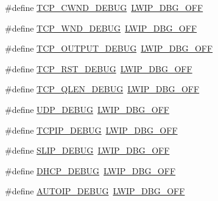 \begin{DoxyCompactItemize}
\item 
\#define \hyperlink{group__lwip__opts__debugmsg_ga66df03d8192cd978d3321a9d68bf5411}{T\+C\+P\+\_\+\+C\+W\+N\+D\+\_\+\+D\+E\+B\+UG}~\hyperlink{group__debugging__levels_gadab1cdc3f45939a3a5c9a3d7e04987e1}{L\+W\+I\+P\+\_\+\+D\+B\+G\+\_\+\+O\+FF}
\item 
\#define \hyperlink{group__lwip__opts__debugmsg_ga3704f433e947d6342da77c74e33627e1}{T\+C\+P\+\_\+\+W\+N\+D\+\_\+\+D\+E\+B\+UG}~\hyperlink{group__debugging__levels_gadab1cdc3f45939a3a5c9a3d7e04987e1}{L\+W\+I\+P\+\_\+\+D\+B\+G\+\_\+\+O\+FF}
\item 
\#define \hyperlink{group__lwip__opts__debugmsg_ga9f70601fdc1feee490772bf7fcdb74fb}{T\+C\+P\+\_\+\+O\+U\+T\+P\+U\+T\+\_\+\+D\+E\+B\+UG}~\hyperlink{group__debugging__levels_gadab1cdc3f45939a3a5c9a3d7e04987e1}{L\+W\+I\+P\+\_\+\+D\+B\+G\+\_\+\+O\+FF}
\item 
\#define \hyperlink{group__lwip__opts__debugmsg_ga37596f7bbb9b7663826244ba54486679}{T\+C\+P\+\_\+\+R\+S\+T\+\_\+\+D\+E\+B\+UG}~\hyperlink{group__debugging__levels_gadab1cdc3f45939a3a5c9a3d7e04987e1}{L\+W\+I\+P\+\_\+\+D\+B\+G\+\_\+\+O\+FF}
\item 
\#define \hyperlink{group__lwip__opts__debugmsg_gae7980c7f8eb45cd411bf410ff0a3fc55}{T\+C\+P\+\_\+\+Q\+L\+E\+N\+\_\+\+D\+E\+B\+UG}~\hyperlink{group__debugging__levels_gadab1cdc3f45939a3a5c9a3d7e04987e1}{L\+W\+I\+P\+\_\+\+D\+B\+G\+\_\+\+O\+FF}
\item 
\#define \hyperlink{group__lwip__opts__debugmsg_ga0393f312c5475a1c649b39ef9cfcaad4}{U\+D\+P\+\_\+\+D\+E\+B\+UG}~\hyperlink{group__debugging__levels_gadab1cdc3f45939a3a5c9a3d7e04987e1}{L\+W\+I\+P\+\_\+\+D\+B\+G\+\_\+\+O\+FF}
\item 
\#define \hyperlink{group__lwip__opts__debugmsg_ga52d6c83451936c3de3b0338d4a3f921f}{T\+C\+P\+I\+P\+\_\+\+D\+E\+B\+UG}~\hyperlink{group__debugging__levels_gadab1cdc3f45939a3a5c9a3d7e04987e1}{L\+W\+I\+P\+\_\+\+D\+B\+G\+\_\+\+O\+FF}
\item 
\#define \hyperlink{group__lwip__opts__debugmsg_gab986f95183559d8678c6d80969b01857}{S\+L\+I\+P\+\_\+\+D\+E\+B\+UG}~\hyperlink{group__debugging__levels_gadab1cdc3f45939a3a5c9a3d7e04987e1}{L\+W\+I\+P\+\_\+\+D\+B\+G\+\_\+\+O\+FF}
\item 
\#define \hyperlink{group__lwip__opts__debugmsg_ga97927ceecabcdb5f41735bf372a05cee}{D\+H\+C\+P\+\_\+\+D\+E\+B\+UG}~\hyperlink{group__debugging__levels_gadab1cdc3f45939a3a5c9a3d7e04987e1}{L\+W\+I\+P\+\_\+\+D\+B\+G\+\_\+\+O\+FF}
\item 
\#define \hyperlink{group__lwip__opts__debugmsg_gafaee522e7f32d81022215e1805e303a5}{A\+U\+T\+O\+I\+P\+\_\+\+D\+E\+B\+UG}~\hyperlink{group__debugging__levels_gadab1cdc3f45939a3a5c9a3d7e04987e1}{L\+W\+I\+P\+\_\+\+D\+B\+G\+\_\+\+O\+FF}

\end{DoxyCompactItemize}

